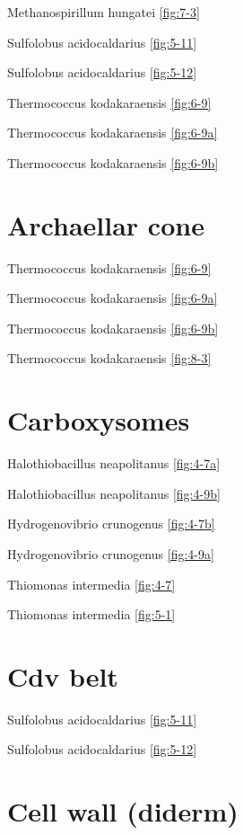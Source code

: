 \documentclass[]{tufte-book}
\begin{document}
Methanospirillum hungatei \ref{fig:7-3}

Sulfolobus acidocaldarius \ref{fig:5-11}

Sulfolobus acidocaldarius \ref{fig:5-12}

Thermococcus kodakaraensis \ref{fig:6-9}

Thermococcus kodakaraensis \ref{fig:6-9a}

Thermococcus kodakaraensis \ref{fig:6-9b}

\section*{Archaellar cone}\label{archaellar-cone}

Thermococcus kodakaraensis \ref{fig:6-9}

Thermococcus kodakaraensis \ref{fig:6-9a}

Thermococcus kodakaraensis \ref{fig:6-9b}

Thermococcus kodakaraensis \ref{fig:8-3}

\section*{Carboxysomes}\label{carboxysomes}

Halothiobacillus neapolitanus \ref{fig:4-7a}

Halothiobacillus neapolitanus \ref{fig:4-9b}

Hydrogenovibrio crunogenus \ref{fig:4-7b}

Hydrogenovibrio crunogenus \ref{fig:4-9a}

Thiomonas intermedia \ref{fig:4-7}

Thiomonas intermedia \ref{fig:5-1}

\section*{Cdv belt}\label{cdv-belt}

Sulfolobus acidocaldarius \ref{fig:5-11}

Sulfolobus acidocaldarius \ref{fig:5-12}

\section*{Cell wall (diderm)}\label{cell-wall-diderm}
\end{document}
